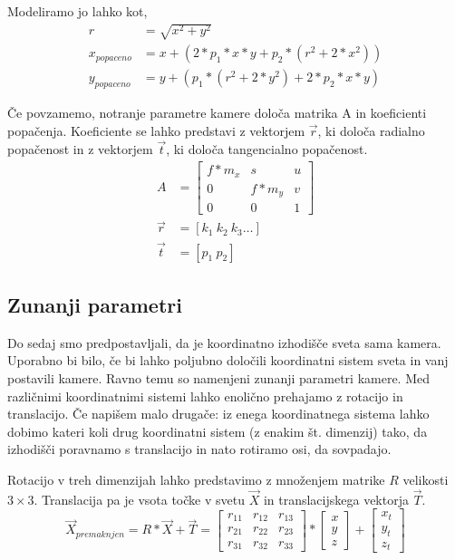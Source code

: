 \documentclass[a4paper, 12pt]{book}
\begin{document}
Modeliramo jo lahko kot,
\begin{align}
\label{tangentialdisteq}
r &= \sqrt{x^2 + y^2} \\ 
x_{popaceno} &= x + (2 * p_1 * x * y + p_2 * (r^2 + 2 * x^2)) \\
y_{popaceno} &= y + (p_1 * (r^2 + 2*y^2) + 2 * p_2 * x * y)
\end{align}

Če povzamemo, notranje parametre kamere določa matrika A in koeficienti popačenja. Koeficiente se lahko predstavi z vektorjem $\vec{r}$, ki določa radialno popačenost in z vektorjem $\vec{t}$, ki določa tangencialno popačenost.
\begin{align*}
A &= 
\begin{bmatrix}
f*m_x & s & u \\
0 & f*m_y & v \\
0 & 0 & 1
\end{bmatrix} \\
\vec{r} &= [k_1 \ k_2 \ k_3 \dots] \\
\vec{t} &= [p_1 \ p_2]
\end{align*}

\subsection{Zunanji parametri}
Do sedaj smo predpostavljali, da je koordinatno izhodišče sveta sama kamera. Uporabno bi bilo, če bi lahko poljubno določili koordinatni sistem sveta in vanj postavili kamere. Ravno temu so namenjeni zunanji parametri kamere. Med različnimi koordinatnimi sistemi lahko enolično prehajamo z rotacijo in translacijo. Če napišem malo drugače: iz enega koordinatnega sistema lahko dobimo kateri koli drug koordinatni sistem (z enakim št. dimenzij) tako, da izhodišči poravnamo s translacijo in nato rotiramo osi, da sovpadajo. 

Rotacijo v treh dimenzijah lahko predstavimo z množenjem matrike $R$ velikosti $3 \times 3$. Translacija pa je vsota točke v svetu $\vec{X}$ in translacijskega vektorja $\vec{T}$.
\begin{equation}
\vec{X}_{premaknjen} = R * \vec{X} + \vec{T} = 
\begin{bmatrix}
r_{11} & r_{12} & r_{13} \\
r_{21} & r_{22} & r_{23} \\
r_{31} & r_{32} & r_{33}
\end{bmatrix}
* 
\begin{bmatrix}
x \\
y \\
z 
\end{bmatrix}
+
\begin{bmatrix}
x_t \\
y_t \\
z_t 
\end{bmatrix}
\label{coordeq}
\end{equation}
\end{document}
